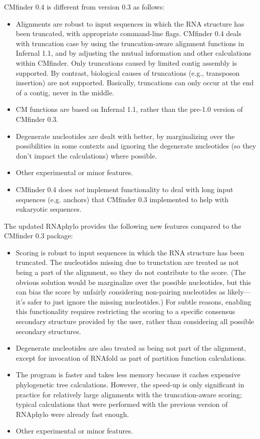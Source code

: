 \documentclass[letterpaper,12pt]{report}
\begin{document}
CMfinder 0.4 is different from version 0.3 as follows:
\begin{itemize}
\item Alignments are robust to input sequences in which the RNA structure has been truncated, with appropriate command-line flags.  
CMfinder 0.4 deals with truncation case by using the truncation-aware alignment functions in Infernal 1.1, and by adjusting the mutual information and other calculations within CMfinder.  Only truncations caused by limited contig assembly is supported.  By contrast, biological causes of truncations (e.g., transposon insertion) are not supported.  Basically, truncations can only occur at the end of a contig, never in the middle.
\item CM functions are based on Infernal 1.1, rather than the pre-1.0 version of CMfinder 0.3.
\item Degenerate nucleotides are dealt with better, by marginalizing over the possibilities in some contexts and ignoring the degenerate nucleotides (so they don't impact the calculations) where possible.
\item Other experimental or minor features.
\item CMfinder 0.4 does {\em not} implement functionality to deal with long input sequences (e.g. anchors) that CMfinder 0.3 implemented to help with eukaryotic sequences.
\end{itemize}

The updated RNAphylo provides the following new features compared to the CMfinder 0.3 package:
\begin{itemize}
\item Scoring is robust to input sequences in which the RNA structure has been truncated.  The nucleotides missing due to trunctation are treated as not being a part of the alignment, so they do not contribute to the score.  (The obvious solution would be marginalize over the possible nucleotides, but this can bias the score by unfairly considering non-pairing nucleotides as likely---it's safer to just ignore the missing nucleotides.)  For subtle reasons, enabling this functionality requires restricting the scoring to a specific consensus secondary structure provided by the user, rather than considering all possible secondary structures.
\item Degenerate nucleotides are also treated as being not part of the alignment, except for invocation of RNAfold as part of partition function calculations.
\item The program is faster and takes less memory because it caches expensive phylogenetic tree calculations.  However, the speed-up is only significant in practice for relatively large alignments with the truncation-aware scoring; typical calculations that were performed with the previous version of RNAphylo were already fast enough.
\item Other experimental or minor features.
\end{itemize}
\end{document}
